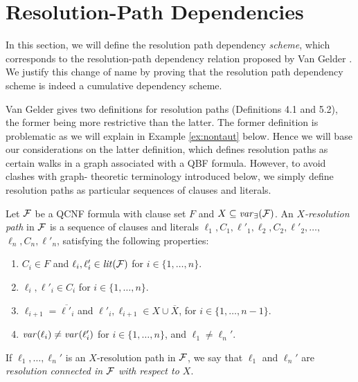 \documentclass{llncs}
\def\hy{\hbox{-}\nobreak\hskip0pt} \newcommand{\ellipsis}{$\dots$}
\begin{document}
\section{Resolution\hy Path Dependencies}
In this section, we will define the resolution path dependency \emph{scheme},
which corresponds to the resolution\hy path dependency relation proposed by
Van Gelder \cite{VanGelder11}. We justify this change of name by proving that
the resolution path dependency scheme is indeed a cumulative dependency
scheme.

Van Gelder \cite{VanGelder11} gives two definitions for resolution paths
(Definitions 4.1 and 5.2), the former being more restrictive than the
latter. The former definition is problematic as we will explain in Example
\ref{ex:nontaut} below. Hence we will base our considerations on the latter
definition, which defines resolution paths as certain walks in a graph
associated with a QBF formula. However, to avoid clashes with graph\hy
theoretic terminology introduced below, we simply define resolution paths as
particular sequences of clauses and literals.

\begin{definition} \label{def:rconnected} Let $\mathcal{F}$ be a
  QCNF formula with clause set $F$ and $X \subseteq \mathit{var}_{\exists}(\mathcal{F})$. An
  \emph{$X$\hy resolution path} in $\mathcal{F}$ is a sequence of clauses and
  literals $\ell_1,C_1,\ell'_1,\ell_2,C_2,\ell'_2,\dots,$\hskip
  0pt$\ell_n,C_n,\ell'_n$, satisfying the following properties:
  \begin{enumerate}
  \item $C_i \in F$ and $\ell_i, \ell'_i \in \mathit{lit}(\mathcal{F})$ for $i \in
      \{1, \dots,n\}$.
  \item $\ell_i, \ell'_i \in C_i$ for $i \in \{1, \dots,n\}$.
  \item $\ell_{i+1}= \overline{\ell'_{i}}$ and $\ell'_i, \ell_{i+1} \in X \cup
    \overline{X}$, for $i \in \{1, \dots,n-1\}$.
  \item $\mathit{var}(\ell_i) \neq \mathit{var}(\ell'_i)$ for $i \in \{1, \dots,n\}$, and
    $\ell_1 \neq \ell_n'$.
\end{enumerate}
If $\ell_1, \dots, \ell_n'$ is an $X$\hy resolution path in $\mathcal{F}$, we say
that $\ell_1$ and $\ell_n'$ are \emph{resolution connected in $\mathcal{F}$ with
  respect to $X$}.
\end{definition}
\end{document}

